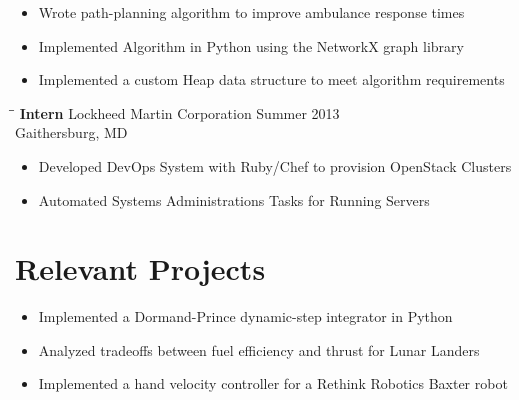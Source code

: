\documentclass[12pt]{res}
\begin{document}
\begin{resume}
	\vspace{-40pt}
	\begin{itemize}
	\item Wrote path-planning algorithm to improve ambulance response times
	\vspace{-10pt}
	\item Implemented Algorithm in Python using the NetworkX graph library
	\vspace{-10pt}
	\item Implemented a custom Heap data structure to meet algorithm requirements
	\end{itemize}
    
    \vspace{-10pt}
    \begin{tabbing}
    \hspace{2.3in}\= \hspace{2.6in}\= \kill %
    \textbf{ Intern } \> Lockheed Martin Corporation \> Summer 2013\\
                  \> Gaithersburg, MD
    \end{tabbing}\vspace{-10pt}

	\vspace{-15pt}
	\begin{itemize}
	\item Developed DevOps System with Ruby/Chef to provision 
		OpenStack Clusters
	\vspace{-10pt} 
	\item Automated Systems Administrations Tasks for Running Servers
	\end{itemize}

  \vspace{-15pt}
  \section{Relevant Projects}
	\vspace{0pt}
	\begin{itemize}
	\item Implemented a Dormand-Prince dynamic-step integrator
		in Python
	\vspace{-10pt}
	\item Analyzed tradeoffs between fuel efficiency and thrust for
		Lunar Landers	
	\vspace{-10pt}
	\item Implemented a hand velocity controller for a Rethink Robotics
		Baxter robot
	\end{itemize}


\end{resume}
\end{document}
